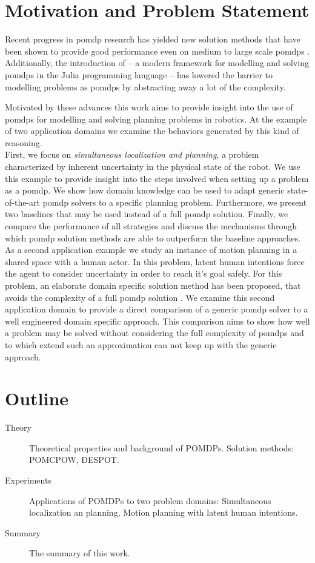 \section{Motivation and Problem Statement}

Recent progress in \ac{pomdp} research has yielded new solution methods that
have been shown to provide good performance even on medium to large scale
\acp{pomdp} \cite{somani2013despot,sunberg2018online}. Additionally, the
introduction of \pomdpsjl \cite{egorov2017pomdps} -- a modern framework for
modelling and solving \acp{pomdp} in the Julia programming language -- has
lowered the barrier to modelling problems as \acp{pomdp} by abstracting away
a lot of the complexity.

Motivated by these advances this work aims to provide insight into the use of
\acp{pomdp} for modelling and solving planning problems in robotics. At the
example of two application domains we examine the behaviors generated by this
kind of reasoning.\\
First, we focus on \emph{simultaneous localization and
planning}, a problem characterized by inherent uncertainty in the physical
state of the robot. We use this example to provide insight into the steps
involved when setting up a problem as a \ac{pomdp}. We show how
domain knowledge can be used to adapt generic state-of-the-art \ac{pomdp}
solvers to a specific planning problem. Furthermore, we present two baselines
that may be used instead of a full \ac{pomdp} solution. Finally, we compare the
performance of all strategies and discuss the mechanisms through which
\ac{pomdp} solution methods are able to outperform the baseline approaches.\\
As a second application example we study an instance of motion planning in
a shared space with a human actor. In this problem, latent human intentions
force the agent to consider uncertainty in order to reach it's goal safely. For
this problem, an elaborate domain specific solution method has been proposed,
that avoids the complexity of a full \ac{pomdp} solution
\cite{fisac2018probabilistically}. We examine this second application domain to
provide a direct comparison of a generic \ac{pomdp} solver to a well engineered
domain specific approach. This comparison aims to show how well a problem may
be solved without considering the full complexity of \acp{pomdp} and to which
extend such an approximation can not keep up with the generic approach.

\section{Outline}

\begin{description}
  \item[Theory] Theoretical properties and background of POMDPs. Solution methods: POMCPOW, DESPOT.
  \item[Experiments] Applications of POMDPs to two problem domains: Simultaneous localization an planning, Motion planning with latent human intentions.
  \item[Summary] The summary of this work.
\end{description}
